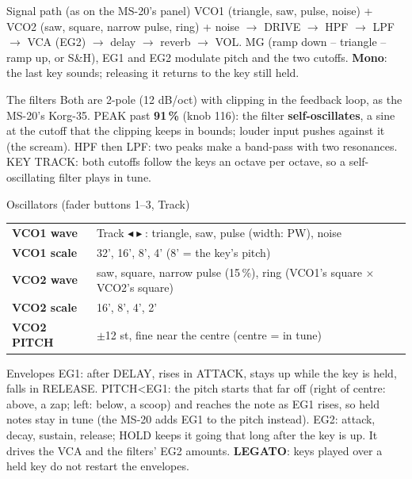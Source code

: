 \documentclass{article}
\newcommand{\MD}[1]{\textcolor{modc}{#1}}
\newcommand{\VC}[1]{\textcolor{vcoc}{#1}}
\newcommand{\FL}[1]{\textcolor{fltc}{#1}}
\newcommand{\EG}[1]{\textcolor{egc}{#1}}
\begin{document}
\vspace{1.2mm}
\begin{minipage}[t]{72mm}\vspace{0pt}
\begin{card}{Signal path (as on the MS-20's panel)}
\VC{VCO1} (triangle, saw, pulse, noise) + \VC{VCO2} (saw, square, narrow pulse, ring) + noise \(\to\)
DRIVE \(\to\) \FL{HPF} \(\to\) \FL{LPF} \(\to\) VCA (\EG{EG2}) \(\to\) delay \(\to\) reverb \(\to\) VOL.
\MD{MG} (ramp down -- triangle -- ramp up, or S\&H), \EG{EG1} and \EG{EG2} modulate pitch and the two cutoffs.
\textbf{Mono}: the last key sounds; releasing it returns to the key still held.
\end{card}
\begin{card}{The filters}
Both are 2-pole (12 dB/oct) with clipping in the feedback loop, as the MS-20's Korg-35. PEAK
past \textbf{91\,\%} (knob 116): the filter \textbf{self-oscillates}, a sine at the cutoff that the
clipping keeps in bounds; louder input pushes against it (the scream). HPF then LPF: two peaks
make a band-pass with two resonances. \FL{KEY TRACK}: both cutoffs follow the keys an octave per
octave, so a self-oscillating filter plays in tune.
\end{card}
\end{minipage}\hfill
\begin{minipage}[t]{70mm}\vspace{0pt}
\begin{card}{Oscillators (fader buttons 1--3, Track)}
\fontsize{6.8}{8.1}\selectfont
\begin{tabularx}{\linewidth}{@{}l L@{}}
\VC{\textbf{VCO1 wave}} & Track \(\blacktriangleleft\blacktriangleright\): triangle, saw, pulse (width: PW), noise \\
\VC{\textbf{VCO1 scale}} & 32', 16', 8', 4' (8' = the key's pitch) \\
\VC{\textbf{VCO2 wave}} & saw, square, narrow pulse (15\,\%), ring (VCO1's square \(\times\) VCO2's square) \\
\VC{\textbf{VCO2 scale}} & 16', 8', 4', 2' \\
\VC{\textbf{VCO2 PITCH}} & \(\pm\)12 st, fine near the centre (centre = in tune) \\
\end{tabularx}
\end{card}
\begin{card}{Envelopes}
\EG{EG1}: after DELAY, rises in ATTACK, stays up while the key is held, falls in RELEASE.
PITCH<EG1: the pitch starts that far off (right of centre: above, a zap; left: below, a scoop) and
reaches the note as EG1 rises, so held notes stay in tune (the MS-20 adds EG1 to the pitch instead). \EG{EG2}: attack, decay, sustain, release; HOLD
keeps it going that long after the key is up. It drives the VCA and the filters' EG2 amounts.
\textbf{LEGATO}: keys played over a held key do not restart the envelopes.
\end{card}
\end{minipage}\hfill
\end{document}
